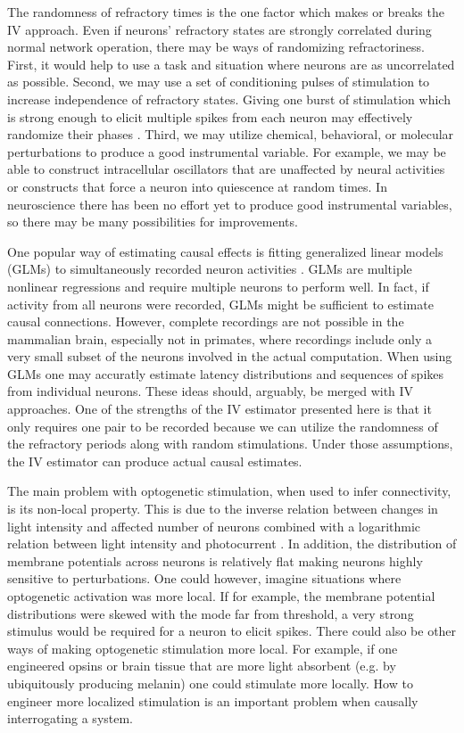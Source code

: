 \documentclass[11pt]{article}
\begin{document}
The randomness of refractory times is the one factor which makes or breaks the IV approach. 
Even if neurons' refractory states are strongly correlated during normal network operation, there may be ways of randomizing refractoriness. 
First, it would help to use a task and situation where neurons are as uncorrelated as possible. 
Second, we may use a set of conditioning pulses of stimulation to increase independence of refractory states. 
Giving one burst of stimulation which is strong enough to elicit multiple spikes from each neuron may effectively randomize their phases \citep{ermentrout2008reliability}.
Third, we may utilize chemical, behavioral, or molecular perturbations to produce a good instrumental variable. 
For example, we may be able to construct intracellular oscillators that are unaffected by neural activities or constructs that force a neuron into quiescence at random times. 
In neuroscience there has been no effort yet to produce good instrumental variables, so there may be many possibilities for improvements.

One popular way of estimating causal effects is fitting generalized linear models (GLMs) to simultaneously recorded neuron activities \citep{pillow2008spatio, roudi2009ising}. 
GLMs are multiple nonlinear regressions and require multiple neurons to perform well. 
In fact, if activity from all neurons were recorded, GLMs might be sufficient to estimate causal connections. 
However, complete recordings are not possible in the mammalian brain, especially not in primates, where recordings include only a very small subset of the neurons involved in the actual computation. 
When using GLMs one may accuratly estimate latency distributions and sequences of spikes from individual neurons. 
These ideas should, arguably, be merged with IV approaches. 
One of the strengths of the IV estimator presented here is that it only requires one pair to be recorded because we can utilize the randomness of the refractory periods along with random stimulations. Under those assumptions, the IV estimator can produce actual causal estimates. 

The main problem with optogenetic stimulation, when used to infer connectivity, is its non-local property. 
This is due to the inverse relation between changes in light intensity and affected number of neurons combined with a logarithmic relation between light intensity and photocurrent \cite{wang2007high}. 
In addition, the distribution of membrane potentials across neurons is relatively flat \citep{destexhe1999impact,rudolph2006use,pare1998impact} making neurons highly sensitive to perturbations. 
One could however, imagine situations where optogenetic activation was more local. 
If for example, the membrane potential distributions were skewed with the mode far from threshold, a very strong stimulus would be required for a neuron to elicit spikes. 
There could also be other ways of making optogenetic stimulation more local. 
For example, if one engineered opsins or brain tissue that are more light absorbent (e.g. by ubiquitously producing melanin) one could stimulate more locally. 
How to engineer more localized stimulation is an important problem when causally interrogating a system.
\end{document}

